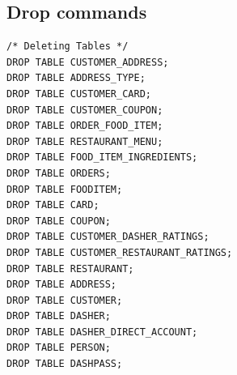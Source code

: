 \documentclass[12pt,letterpaper]{article}
\begin{document}
\subsection*{Drop commands}
\begin{lstlisting}
/* Deleting Tables */
DROP TABLE CUSTOMER_ADDRESS; 
DROP TABLE ADDRESS_TYPE; 
DROP TABLE CUSTOMER_CARD; 
DROP TABLE CUSTOMER_COUPON; 
DROP TABLE ORDER_FOOD_ITEM; 
DROP TABLE RESTAURANT_MENU; 
DROP TABLE FOOD_ITEM_INGREDIENTS;
DROP TABLE ORDERS;
DROP TABLE FOODITEM;
DROP TABLE CARD;
DROP TABLE COUPON;
DROP TABLE CUSTOMER_DASHER_RATINGS;
DROP TABLE CUSTOMER_RESTAURANT_RATINGS;
DROP TABLE RESTAURANT;
DROP TABLE ADDRESS;
DROP TABLE CUSTOMER;
DROP TABLE DASHER;
DROP TABLE DASHER_DIRECT_ACCOUNT;
DROP TABLE PERSON;
DROP TABLE DASHPASS;
\end{lstlisting}
\end{document}
